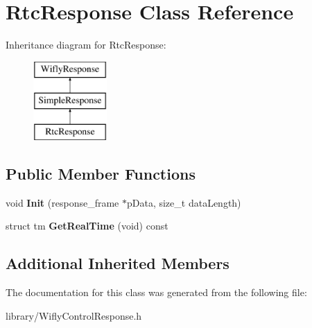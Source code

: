 \hypertarget{class_rtc_response}{\section{Rtc\-Response Class Reference}
\label{class_rtc_response}
}
Inheritance diagram for Rtc\-Response\-:\begin{figure}[H]
\begin{center}
\leavevmode
\includegraphics[height=3.000000cm]{class_rtc_response}
\end{center}
\end{figure}
\subsection*{Public Member Functions}
\begin{DoxyCompactItemize}
\item 
\hypertarget{class_rtc_response_ae5a5c5618830487cbc9d1197a47e3659}{void {\bfseries Init} (response\-\_\-frame $\ast$p\-Data, size\-\_\-t data\-Length)}\label{class_rtc_response_ae5a5c5618830487cbc9d1197a47e3659}

\item 
\hypertarget{class_rtc_response_abdf1aa92c47891e4ca9672a9244672a6}{struct tm {\bfseries Get\-Real\-Time} (void) const }\label{class_rtc_response_abdf1aa92c47891e4ca9672a9244672a6}

\end{DoxyCompactItemize}
\subsection*{Additional Inherited Members}


The documentation for this class was generated from the following file\-:\begin{DoxyCompactItemize}
\item 
library/Wifly\-Control\-Response.\-h\end{DoxyCompactItemize}
